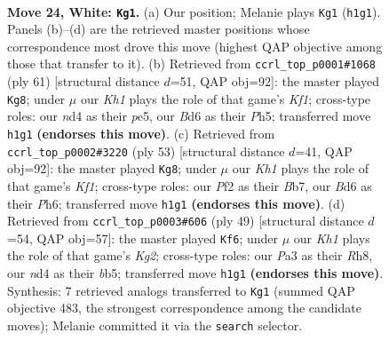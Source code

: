 \documentclass[11pt]{article}
\begin{document}
\clearpage

\begin{figure}[p]\centering
\begin{subfigure}{0.46\textwidth}\centering
\resizebox{\linewidth}{!}{%
\newchessgame
\chessboard[
  setfen={r5k1/p4p1p/Q2B2p1/8/3nr3/P4q2/5P1P/R6K w - - 3 24},
  showmover=false,
  pgfstyle=straightmove, color=movearrow, markmove={h1-g1}
]}
\caption{}
\end{subfigure}\hfill
\begin{subfigure}{0.46\textwidth}\centering
\resizebox{\linewidth}{!}{%
\newchessgame
\chessboard[
  setfen={2r2k2/5p2/p1p4Q/4Pp1p/2b5/4P3/P2R1KPq/8 b - - 3 31},
  showmover=false,
  pgfstyle=straightmove, color=movearrow, markmove={f8-g8}
]}
\caption{}
\end{subfigure}
\\[4pt]
\begin{subfigure}{0.46\textwidth}\centering
\resizebox{\linewidth}{!}{%
\newchessgame
\chessboard[
  setfen={r4k2/pb6/1pp2Q1p/5P2/5qP1/7P/PP6/1K5R b - - 0 27},
  showmover=false,
  pgfstyle=straightmove, color=movearrow, markmove={f8-g8}
]}
\caption{}
\end{subfigure}\hfill
\begin{subfigure}{0.46\textwidth}\centering
\resizebox{\linewidth}{!}{%
\newchessgame
\chessboard[
  setfen={7r/5pk1/4p2p/1Bq1b3/6QP/1P6/5PP1/5RK1 b - - 0 25},
  showmover=false,
  pgfstyle=straightmove, color=movearrow, markmove={g7-f6}
]}
\caption{}
\end{subfigure}
\caption{\textbf{Move 24, White: \texttt{Kg1}.} (a) Our position; Melanie plays \texttt{Kg1} (\texttt{h1g1}). Panels (b)--(d) are the retrieved master positions whose correspondence most drove this move (highest QAP objective among those that transfer to it). (b) Retrieved from \texttt{ccrl\_top\_p0001\#1068} (ply 61) [structural distance $d$=51, QAP obj=92]: the master played \texttt{Kg8}; under $\mu$ our \emph{Kh1} plays the role of that game's \emph{Kf1}; cross-type roles: our \emph{n}d4 as their \emph{p}e5, our \emph{B}d6 as their \emph{P}h5; transferred move \texttt{h1g1} \textbf{(endorses this move)}. (c) Retrieved from \texttt{ccrl\_top\_p0002\#3220} (ply 53) [structural distance $d$=41, QAP obj=92]: the master played \texttt{Kg8}; under $\mu$ our \emph{Kh1} plays the role of that game's \emph{Kf1}; cross-type roles: our \emph{P}f2 as their \emph{B}b7, our \emph{B}d6 as their \emph{P}h6; transferred move \texttt{h1g1} \textbf{(endorses this move)}. (d) Retrieved from \texttt{ccrl\_top\_p0003\#606} (ply 49) [structural distance $d$=54, QAP obj=57]: the master played \texttt{Kf6}; under $\mu$ our \emph{Kh1} plays the role of that game's \emph{Kg2}; cross-type roles: our \emph{P}a3 as their \emph{R}h8, our \emph{n}d4 as their \emph{b}b5; transferred move \texttt{h1g1} \textbf{(endorses this move)}. Synthesis: 7 retrieved analogs transferred to \texttt{Kg1} (summed QAP objective 483, the strongest correspondence among the candidate moves); Melanie committed it via the \texttt{search} selector.}
\label{fig:thought-m46}
\end{figure}
\end{document}
